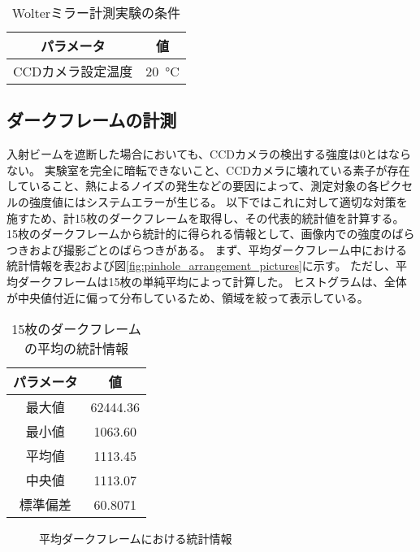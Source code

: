 \begin{table}[!ht]
\begin{center}
  \begin{tabular}{|c|c|} \hline
    パラメータ & 値 \\ \hline
    CCDカメラ設定温度 & \SI{20}{\degreeCelsius}  \\ \hline
  \end{tabular}
  \caption{Wolterミラー計測実験の条件}
  \label{tb:mirror_experiment_params}
\end{center}
\end{table}

\subsection{ダークフレームの計測}
\label{chap5_darkflame_measurement}

入射ビームを遮断した場合においても、CCDカメラの検出する強度は0とはならない。
実験室を完全に暗転できないこと、CCDカメラに壊れている素子が存在していること、熱によるノイズの発生などの要因によって、測定対象の各ピクセルの強度値にはシステムエラーが生じる。
以下ではこれに対して適切な対策を施すため、計15枚のダークフレームを取得し、その代表的統計値を計算する。
15枚のダークフレームから統計的に得られる情報として、画像内での強度のばらつきおよび撮影ごとのばらつきがある。
まず、平均ダークフレーム中における統計情報を表\ref{tb:darkflame_average_data}および図\ref{fig:pinhole_arrangement_pictures}に示す。
ただし、平均ダークフレームは15枚の単純平均によって計算した。
ヒストグラムは、全体が中央値付近に偏って分布しているため、領域を絞って表示している。

\begin{table}[!ht]
\begin{center}
  \begin{tabular}{|c|c|} \hline
    パラメータ & 値 \\ \hline
    最大値 & 62444.36 \\
    最小値 & 1063.60 \\
    平均値 & 1113.45 \\
    中央値 & 1113.07 \\
    標準偏差 & 60.8071 \\ \hline
  \end{tabular}
  \caption{15枚のダークフレームの平均の統計情報}
  \label{tb:darkflame_average_data}
\end{center}
\end{table}

\begin{figure}[!ht]
\centering


\caption[]{平均ダークフレームにおける統計情報}
\label{fig:darkflame_average_stat}
\end{figure}

